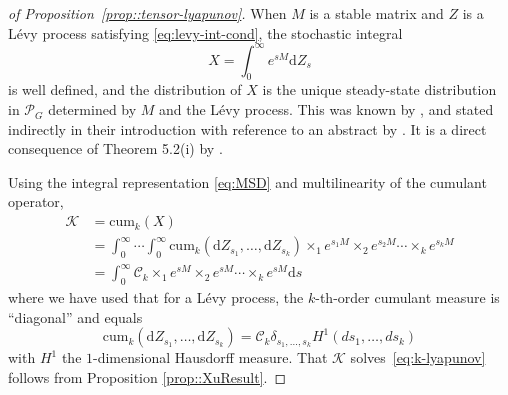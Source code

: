 \documentclass{biometrika}
\begin{document}
\begin{proof}[of Proposition~\ref{prop::tensor-lyapunov}] When $M$ is a 
stable matrix and $Z$ is a Lévy process satisfying \eqref{eq:levy-int-cond}, 
the stochastic integral 
\begin{equation}
		\label{eq:MSD}
		X = \int_0^{\infty} e^{sM} \mathrm{d} Z_s
\end{equation}
is well defined, and the distribution of $X$ is the unique steady-state distribution 
in $\mathcal{P}_G$ determined by $M$ and the Lévy process. This was known by \cite{Sato:1984}, 
and stated indirectly in their introduction with reference to an abstract by \cite{Wolfe:1982}.
It is a direct consequence of Theorem 5.2(i) by \cite{sato_stationary_1983}.

Using the integral representation \eqref{eq:MSD} and multilinearity of the cumulant operator,
	\begin{align*}
		\mathcal{K}  & = \mathrm{cum}_k(X)                                                                                                                                                              \\
		  & = \int_0^{\infty} \! \cdots \! \int_0^{\infty}  \mathrm{cum}_k(\mathrm{d} Z_{s_1}, \ldots, \mathrm{d} Z_{s_k}) \times_1 e^{s_1 M} \times_2 e^{s_2 M} \cdots \times_{k} e^{s_k M} \\ & = \int_0^{\infty} \mathcal{C}_k \times_1 e^{s M} \times_2 e^{sM} \cdots \times_{k} e^{s M} \mathrm{d} s
	\end{align*}
	where we have used that for a Lévy process, the $k$-th-order cumulant measure is ``diagonal'' and equals $$\mathrm{cum}_k(\mathrm{d} Z_{s_1}, \ldots, \mathrm{d} Z_{s_k}) = \mathcal{C}_k \delta_{s_1, \ldots, s_k} H^{1}(ds_1, \ldots, ds_k)$$ with $H^{1}$ the $1$-dimensional Hausdorff measure.
	That $\mathcal{K} $ solves~\eqref{eq:k-lyapunov} follows from Proposition \ref{prop::XuResult}.
\end{proof}

\end{document}
